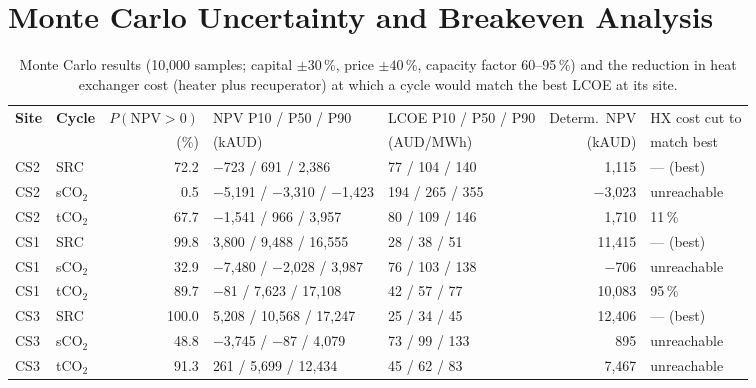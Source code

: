 \documentclass[12pt,a4paper]{report}
\begin{document}
\section{Monte Carlo Uncertainty and Breakeven Analysis}
\label{sec:rq3_montecarlo}

\begin{table}[H]
\centering
\caption{Monte Carlo results (10,000 samples; capital $\pm 30$\,\%, price
$\pm 40$\,\%, capacity factor 60--95\,\%) and the reduction in heat exchanger
cost (heater plus recuperator) at which a cycle would match the best LCOE at
its site.}
\label{tab:montecarlo}
\renewcommand{\arraystretch}{1.25}
\setlength{\tabcolsep}{3.5pt}
\scriptsize
\begin{tabular}{@{}l l r l l r l@{}}
\toprule
\rowcolor{tableheader}
\textbf{Site} & \textbf{Cycle} & $P(\mathrm{NPV}>0)$ & NPV P10 / P50 / P90 & LCOE P10 / P50 / P90 & Determ.\ NPV & HX cost cut to \\
\rowcolor{tableheader}
 & & (\%) & (kAUD) & (AUD/MWh) & (kAUD) & match best \\
\midrule
\rowcolor{rowgray} CS2 & SRC     & 72.2  & $-$723 / 691 / 2{,}386 & 77 / 104 / 140 & 1{,}115 & --- (best) \\
                   CS2 & sCO$_2$ & 0.5   & $-$5{,}191 / $-$3{,}310 / $-$1{,}423 & 194 / 265 / 355 & $-$3{,}023 & unreachable \\
\rowcolor{rowgray} CS2 & tCO$_2$ & 67.7  & $-$1{,}541 / 966 / 3{,}957 & 80 / 109 / 146 & 1{,}710 & 11\,\% \\
\midrule
                   CS1 & SRC     & 99.8  & 3{,}800 / 9{,}488 / 16{,}555 & 28 / 38 / 51 & 11{,}415 & --- (best) \\
\rowcolor{rowgray} CS1 & sCO$_2$ & 32.9  & $-$7{,}480 / $-$2{,}028 / 3{,}987 & 76 / 103 / 138 & $-$706 & unreachable \\
                   CS1 & tCO$_2$ & 89.7  & $-$81 / 7{,}623 / 17{,}108 & 42 / 57 / 77 & 10{,}083 & 95\,\% \\
\midrule
\rowcolor{rowgray} CS3 & SRC     & 100.0 & 5{,}208 / 10{,}568 / 17{,}247 & 25 / 34 / 45 & 12{,}406 & --- (best) \\
                   CS3 & sCO$_2$ & 48.8  & $-$3{,}745 / $-$87 / 4{,}079 & 73 / 99 / 133 & 895 & unreachable \\
\rowcolor{rowgray} CS3 & tCO$_2$ & 91.3  & 261 / 5{,}699 / 12{,}434 & 45 / 62 / 83 & 7{,}467 & unreachable \\
\bottomrule
\end{tabular}
\end{table}
\end{document}
